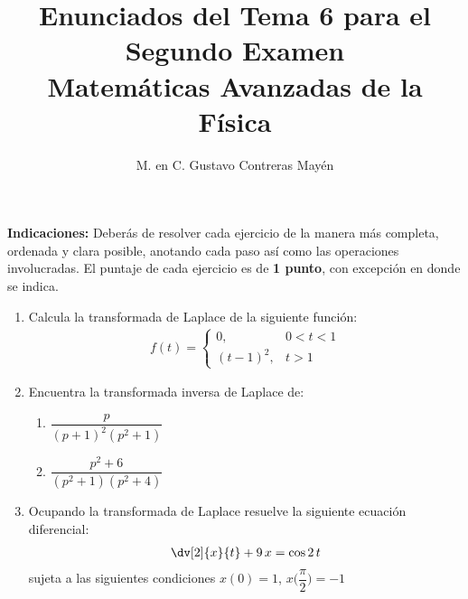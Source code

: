 
\title{Enunciados del Tema 6 para el Segundo Examen \\[0.3em]  \large{Matemáticas Avanzadas de la Física}\vspace{-3ex}}
\author{M. en C. Gustavo Contreras Mayén}
\date{ }

\vspace{-4cm}
\maketitle
\fontsize{14}{14}\selectfont

\textbf{Indicaciones: } Deberás de resolver cada ejercicio de la manera más completa, ordenada y clara posible, anotando cada paso así como las operaciones involucradas. El puntaje de cada ejercicio es de \textbf{1 punto}, con excepción en donde se indica.

\begin{enumerate}

\item Calcula la transformada de Laplace de la siguiente función:
\begin{align*}
f (t) = \begin{cases}
0, & 0 < t < 1 \\
(t - 1)^{2}, & t > 1
\end{cases}
\end{align*}
\item Encuentra la transformada inversa de Laplace de:
\begin{enumerate}[label=\alph*)]
\item $\dfrac{p}{(p + 1)^{2} (p^{2} + 1)}$
\item $\dfrac{p^{2} + 6}{(p^{2} + 1) (p^{2} + 4)}$
\end{enumerate}
\item Ocupando la transformada de Laplace resuelve la siguiente ecuación diferencial:
\begin{align*}
\dv[2]{x}{t} + 9 \, x = \cos 2 \, t
\end{align*}
sujeta a las siguientes condiciones $x (0) =  1$, $x \bigg( \dfrac{\pi}{2} \bigg) = -1$
\end{enumerate}
